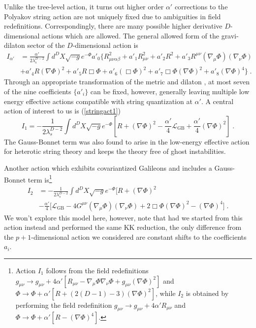 \documentclass[amsmath,amssymb,11pt]{article}
\newcommand{\beq}{\begin{equation}}
\newcommand{\eeq}{\end{equation}}
\begin{document}
Unlike the tree-level action, it turns out higher order $\alpha'$ corrections to the Polyakov string action are not uniquely fixed due to ambiguities in field redefinitions. Correspondingly, there are many possible higher derivative $D$-dimensional actions which are allowed. The general allowed form of the gravi-dilaton sector of the $D$-dimensional action is 
\beq 
\begin{split}
I_{\alpha'}&=\frac{\alpha'}{2\lambda^{D-2}_{s}}\int d^{D}X\sqrt{-g}e^{-\Phi}a'_{0}\biggr\{R^{2}_{\mu\nu\alpha\beta}+a'_{1}R^{2}_{\mu\nu}+a'_{2}R^{2}+a'_{3}R^{\mu\nu}(\nabla_{\mu}\Phi)(\nabla_{\nu}\Phi)\\
&+a'_{4}R(\nabla\Phi)^{2}+a'_{5}R\Box\Phi+a'_{6}(\Box\Phi)^{2}+a'_{7}\Box\Phi(\nabla\Phi)^{2}+a'_{8}(\nabla\Phi)^{4}\biggr\}\;.
\end{split}
\eeq 
Through an appropriate transformation of the metric and dilaton \cite{Metsaev87-1}, at most seven of the nine coefficients $\{a'_{i}\}$ can be fixed, however, generally leaving multiple low energy effective actions compatible with string quantization at $\alpha'$. A central action of interest to us is (\ref{stringact1})
\beq I_{1}=-\frac{1}{2\lambda_{s}^{D-2}}\int d^{D}X\sqrt{-g}e^{-\Phi}\left[R+(\nabla\Phi)^{2}-\frac{\alpha'}{4}\mathcal{L}_{\text{GB}}+\frac{\alpha'}{4}(\nabla\Phi)^{2}\right]\;.\eeq
The Gauss-Bonnet term was also found to arise in the low-energy effective action for heterotic string theory \cite{Zwiebach:1985uq} and keeps the theory free of ghost instabilities. 

Another action which exhibits covariantized Galileons and includes a Gauss-Bonnet term is\footnote{Action $I_{1}$ follows from the field redefinitions $g_{\mu\nu}\to g_{\mu\nu}+4\alpha'[R_{\mu\nu}-\nabla_{\mu}\Phi\nabla_{\nu}\Phi+g_{\mu\nu}(\nabla\Phi)^{2}]$ and $\Phi\to\Phi+\alpha'[R+(2(D-1)-3)(\nabla\Phi)^{2}]$, while $I_{2}$ is obtained by performing the field redefinition $g_{\mu\nu}\to g_{\mu\nu}+4\alpha'R_{\mu\nu}$ and $\Phi\to\Phi+\alpha'[R-(\nabla\Phi)^{4}]$.}
\beq 
\begin{split}
I_{2}&=-\frac{1}{2\lambda_{s}^{D-2}}\int d^{D}X\sqrt{-g}e^{-\Phi}\biggr[R+(\nabla\Phi)^{2}\\
&-\frac{\alpha'}{4}[\mathcal{L}_{\text{GB}}-4G^{\mu\nu}(\nabla_{\mu}\Phi)(\nabla_{\nu}\Phi)+2\Box\Phi(\nabla\Phi)^{2}-(\nabla\Phi)^{4}\biggr]\;.
\end{split}
\eeq
We won't explore this model here, however, note that had we started from this action instead and performed the same KK reduction, the only difference from the $p+1$-dimensional action we considered are constant shifts to the coefficients $a_{i}$. 
\end{document}
